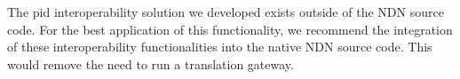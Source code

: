 The \gls{pid} interoperability solution we developed exists outside of the NDN source code. For the best application of this functionality, we recommend the integration of these interoperability functionalities into the native NDN source code. This would remove the need to run a translation gateway.


